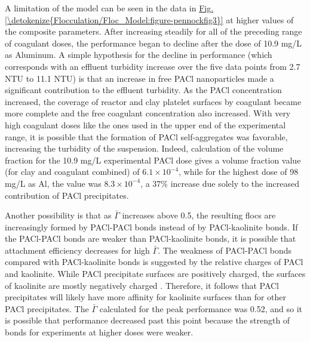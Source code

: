 \documentclass[letterpaper,10pt,english]{sphinxmanual}
\begin{document}
A limitation of the model can be seen in the data in \hyperref[\detokenize{Flocculation/Floc_Model:figure-pennockfig3}]{Fig.\@ \ref{\detokenize{Flocculation/Floc_Model:figure-pennockfig3}}} at higher values of the composite parameters. After increasing steadily for all of the preceding range of coagulant doses, the performance began to decline after the dose of 10.9 mg/L as Aluminum. A simple hypothesis for the decline in performance (which corresponds with an effluent turbidity increase over the five data points from 2.7 NTU to 11.1 NTU) is that an increase in free PACl nanoparticles made a significant contribution to the effluent turbidity. As the PACl concentration increased, the coverage of reactor and clay platelet surfaces by coagulant became more complete and the free coagulant concentration also increased. With very high coagulant doses like the ones used in the upper end of the experimental range, it is possible that the formation of PACl self-aggregates was favorable, increasing the turbidity of the suspension. Indeed, calculation of the volume fraction for the 10.9 mg/L experimental PACl dose gives a volume fraction value (for clay and coagulant combined) of \(6.1\times10^{-4}\), while for the highest dose of 98 mg/L as Al, the value was \(8.3\times10^{-4}\), a 37\% increase due solely to the increased contribution of PACl precipitates.

Another possibility is that as \(\bar{\Gamma}\) increases above 0.5, the resulting flocs are increasingly formed by PACl-PACl bonds instead of by PACl-kaolinite bonds. If the PACl-PACl bonds are weaker than PACl-kaolinite bonds, it is possible that attachment efficiency decreases for high \(\bar{\Gamma}\). The weakness of PACl-PACl bonds compared with PACl-kaolinite bonds is suggested by the relative charges of PACl and kaolinite. While PACl precipitate surfaces are positively charged, the surfaces of kaolinite are mostly negatively charged \label{\detokenize{Flocculation/Floc_Model:id24}}{\hyperref[\detokenize{Flocculation/Floc_Model:floc-model-wei-coagulation-2015}]{\sphinxcrossref{{[}WZL+15{]}}}}. Therefore, it follows that PACl precipitates will likely have more affinity for kaolinite surfaces than for other PACl precipitates. The \(\bar{\Gamma}\) calculated for the peak performance was 0.52, and so it is possible that performance decreased past this point because the strength of bonds for experiments at higher doses were weaker.
\end{document}
